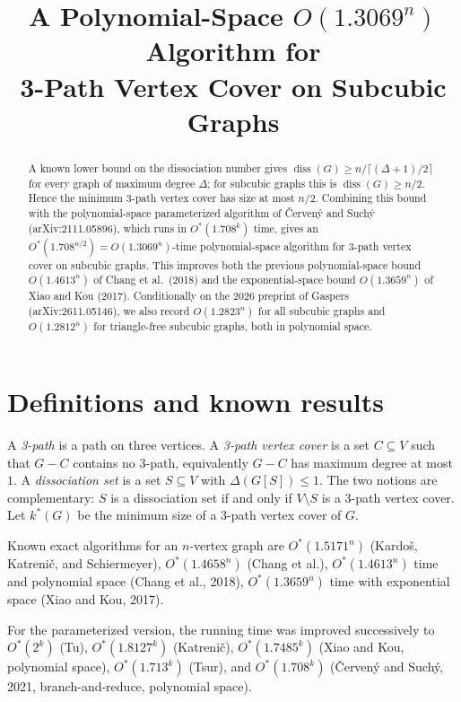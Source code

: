 \documentclass[11pt]{article}
\title{A Polynomial-Space $O(1.3069^n)$ Algorithm for\\ 3-Path Vertex Cover on Subcubic Graphs}
\author{}
\date{}
\begin{document}
\maketitle

\begin{abstract}
A known lower bound on the dissociation number gives
$\operatorname{diss}(G) \ge n/\lceil(\Delta+1)/2\rceil$ for every graph of maximum
degree $\Delta$; for subcubic graphs this is $\operatorname{diss}(G) \ge n/2$.
Hence the minimum 3-path vertex cover has size at most $n/2$. Combining this bound
with the polynomial-space parameterized algorithm of \v{C}erven\'y and Such\'y
(arXiv:2111.05896), which runs in $O^*(1.708^k)$ time, gives an
$O^*(1.708^{n/2}) = O(1.3069^n)$-time polynomial-space algorithm for 3-path vertex
cover on subcubic graphs. This improves both the previous polynomial-space bound
$O(1.4613^n)$ of Chang et al.\ (2018) and the exponential-space bound
$O(1.3659^n)$ of Xiao and Kou (2017). Conditionally on the 2026 preprint of Gaspers
(arXiv:2611.05146), we also record $O(1.2823^n)$ for all subcubic graphs and
$O(1.2812^n)$ for triangle-free subcubic graphs, both in polynomial space.
\end{abstract}

\section{Definitions and known results}

A \emph{3-path} is a path on three vertices. A \emph{3-path vertex cover} is a set
$C \subseteq V$ such that $G-C$ contains no 3-path, equivalently $G-C$ has maximum
degree at most $1$. A \emph{dissociation set} is a set $S \subseteq V$ with
$\Delta(G[S]) \le 1$. The two notions are complementary: $S$ is a dissociation set if
and only if $V \setminus S$ is a 3-path vertex cover. Let $k^*(G)$ be the minimum size
of a 3-path vertex cover of $G$.

Known exact algorithms for an $n$-vertex graph are
$O^*(1.5171^n)$ (Kardo\v{s}, Katreni\v{c}, and Schiermeyer),
$O^*(1.4658^n)$ (Chang et al.),
$O^*(1.4613^n)$ time and polynomial space (Chang et al., 2018),
$O^*(1.3659^n)$ time with exponential space (Xiao and Kou, 2017).

For the parameterized version, the running time was improved successively to
$O^*(2^k)$ (Tu), $O^*(1.8127^k)$ (Katreni\v{c}), $O^*(1.7485^k)$ (Xiao and Kou, polynomial
space), $O^*(1.713^k)$ (Tsur), and $O^*(1.708^k)$ (\v{C}erven\'y and Such\'y, 2021,
branch-and-reduce, polynomial space).
\end{document}
